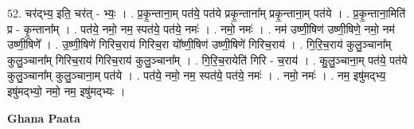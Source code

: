 \documentclass[17pt]{extarticle}
\begin{document}
52. चर॑द्भ्य॒ इति॒ चर॑त् - भ्यः॒ । . प्र॒कृ॒न्ताना॒म् पत॑ये॒ पत॑ये प्रकृ॒न्ताना᳚म् प्रकृ॒न्ताना॒म् पत॑ये । . प्र॒कृ॒न्ताना॒मिति॑ प्र - कृ॒न्ताना᳚म् । . पत॑ये॒ नमो॒ नम॒ स्पत॑ये॒ पत॑ये॒ नमः॑ । . नमो॒ नमः॑ । . नम॑ उष्णी॒षिण॑ उष्णी॒षिणे॒ नमो॒ नम॑ उष्णी॒षिणे᳚ । . उ॒ष्णी॒षिणे॑ गिरिच॒राय॑ गिरिच॒रा यो᳚ष्णी॒षिण॑ उष्णी॒षिणे॑ गिरिच॒राय॑ । . गि॒रि॒च॒राय॑ कुलु॒ञ्चाना᳚म् कुलु॒ञ्चाना᳚म् गिरिच॒राय॑ गिरिच॒राय॑ कुलु॒ञ्चाना᳚म् । . गि॒रि॒च॒रायेति॑ गिरि - च॒राय॑ । . कु॒लु॒ञ्चाना॒म् पत॑ये॒ पत॑ये कुलु॒ञ्चाना᳚म् कुलु॒ञ्चाना॒म् पत॑ये । . पत॑ये॒ नमो॒ नम॒ स्पत॑ये॒ पत॑ये॒ नमः॑ । . नमो॒ नमः॑ । . नम॒ इषु॑मद्भ्य॒ इषु॑मद्भ्यो॒ नमो॒ नम॒ इषु॑मद्भ्यः । \newline

\textbf{Ghana Paata } \newline
\end{document}
